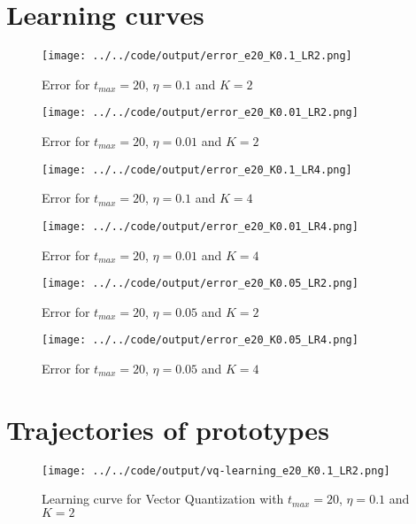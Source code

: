 \documentclass[twoside, a4paper, fleqn, reqno]{article}
\begin{document}
\section{Learning curves}

\begin{figure}[H]
	\centering
	\texttt{[image: ../../code/output/error\_e20\_K0.1\_LR2.png]}
	\caption{Error for $t_{max}=20$, $\eta = 0.1$ and $K = 2$}
	\label{fig:error_e20_K0.1_LR2}
\end{figure}

\begin{figure}[H]
	\centering
	\texttt{[image: ../../code/output/error\_e20\_K0.01\_LR2.png]}
	\caption{Error for $t_{max}=20$, $\eta = 0.01$ and $K = 2$}
	\label{fig:error_e20_K0.01_LR2}
\end{figure}

\begin{figure}[H]
	\centering
	\texttt{[image: ../../code/output/error\_e20\_K0.1\_LR4.png]}
	\caption{Error for $t_{max}=20$, $\eta = 0.1$ and $K = 4$}
	\label{fig:error_e20_K0.1_LR4}
\end{figure}

\begin{figure}[H]
	\centering
	\texttt{[image: ../../code/output/error\_e20\_K0.01\_LR4.png]}
	\caption{Error for $t_{max}=20$, $\eta = 0.01$ and $K = 4$}
	\label{fig:error_e20_K0.01_LR4}
\end{figure}

\begin{figure}[H]
	\centering
	\texttt{[image: ../../code/output/error\_e20\_K0.05\_LR2.png]}
	\caption{Error for $t_{max}=20$, $\eta = 0.05$ and $K = 2$}
	\label{fig:error_e20_K0.05_LR2}
\end{figure}

\begin{figure}[H]
	\centering
	\texttt{[image: ../../code/output/error\_e20\_K0.05\_LR4.png]}
	\caption{Error for $t_{max}=20$, $\eta = 0.05$ and $K = 4$}
	\label{fig:error_e20_K0.05_LR4}
\end{figure}

\section{Trajectories of prototypes}

\begin{figure}[H]
	\centering
	\texttt{[image: ../../code/output/vq-learning\_e20\_K0.1\_LR2.png]}
	\caption{Learning curve for Vector Quantization with $t_{max}=20$, $\eta=0.1$ and $K=2$}
	\label{fig:vq-learning_e20_K0.1_LR2}
\end{figure}
\end{document}
